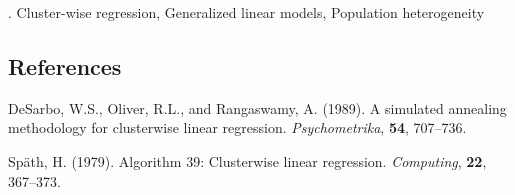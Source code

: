 \documentclass[12pt]{article}
\begin{document}
\vskip 2mm

.
Cluster-wise regression, Generalized linear models, Population heterogeneity


%        
%
%        

\subsection*{References}

\begin{description}

\item
DeSarbo, W.S., Oliver, R.L., and Rangaswamy, A. (1989). 
A simulated annealing methodology for clusterwise linear regression. 
\textit{Psychometrika},
\textbf{54}, 707--736.

\item
Sp\"{a}th, H. (1979). 
Algorithm 39: Clusterwise linear regression. 
\textit{Computing},
\textbf{22}, 367--373.

\end{description}
\end{document}
